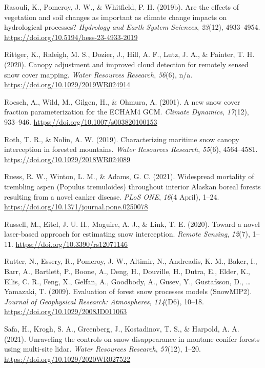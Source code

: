 \documentclass[
  letterpaper,
]{tex/uofsthesis-cs}
\newlength{\cslhangindent}
\newenvironment{CSLReferences}[2] %
 {\begin{list}{}{%
  \setlength{\itemindent}{0pt}
  \setlength{\leftmargin}{0pt}
  \setlength{\parsep}{0pt}
  \ifodd #1
   \setlength{\leftmargin}{\cslhangindent}
   \setlength{\itemindent}{-1\cslhangindent}
  \fi
  \setlength{\itemsep}{#2\baselineskip}}}
 {\end{list}}
\begin{document}
\begin{CSLReferences}{1}{0}
Rasouli, K., Pomeroy, J. W., \& Whitfield, P. H. (2019b). Are the
effects of vegetation and soil changes as important as climate change
impacts on hydrological processes? \emph{Hydrology and Earth System
Sciences}, \emph{23}(12), 4933--4954.
\url{https://doi.org/10.5194/hess-23-4933-2019}

Rittger, K., Raleigh, M. S., Dozier, J., Hill, A. F., Lutz, J. A., \&
Painter, T. H. (2020). Canopy adjustment and improved cloud detection
for remotely sensed snow cover mapping. \emph{Water Resources Research},
\emph{56}(6), n/a. \url{https://doi.org/10.1029/2019WR024914}

Roesch, A., Wild, M., Gilgen, H., \& Ohmura, A. (2001). A new snow cover
fraction parameterization for the {ECHAM4 GCM}. \emph{Climate Dynamics},
\emph{17}(12), 933--946. \url{https://doi.org/10.1007/s003820100153}

Roth, T. R., \& Nolin, A. W. (2019). Characterizing maritime snow canopy
interception in forested mountains. \emph{Water Resources Research},
\emph{55}(6), 4564--4581. \url{https://doi.org/10.1029/2018WR024089}

Ruess, R. W., Winton, L. M., \& Adams, G. C. (2021). Widespread
mortality of trembling aspen ({Populus} tremuloides) throughout interior
{Alaskan} boreal forests resulting from a novel canker disease.
\emph{PLoS ONE}, \emph{16}(4 April), 1--24.
\url{https://doi.org/10.1371/journal.pone.0250078}

Russell, M., Eitel, J. U. H., Maguire, A. J., \& Link, T. E. (2020).
Toward a novel laser-based approach for estimating snow interception.
\emph{Remote Sensing}, \emph{12}(7), 1--11.
\url{https://doi.org/10.3390/rs12071146}

Rutter, N., Essery, R., Pomeroy, J. W., Altimir, N., Andreadis, K. M.,
Baker, I., Barr, A., Bartlett, P., Boone, A., Deng, H., Douville, H.,
Dutra, E., Elder, K., Ellis, C. R., Feng, X., Gelfan, A., Goodbody, A.,
Gusev, Y., Gustafsson, D., \ldots{} Yamazaki, T. (2009). Evaluation of
forest snow processes models ({SnowMIP2}). \emph{Journal of Geophysical
Research: Atmospheres}, \emph{114}(D6), 10--18.
\url{https://doi.org/10.1029/2008JD011063}

Safa, H., Krogh, S. A., Greenberg, J., Kostadinov, T. S., \& Harpold, A.
A. (2021). Unraveling the controls on snow disappearance in montane
conifer forests using multi-site lidar. \emph{Water Resources Research},
\emph{57}(12), 1--20. \url{https://doi.org/10.1029/2020WR027522}


\end{CSLReferences}
\end{document}
